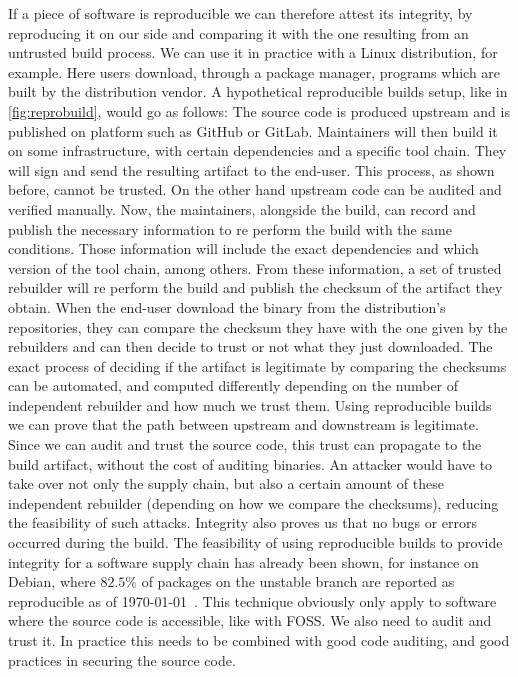 \documentclass[a4paper,11pt,oneside]{report}
\theoremstyle{definition}
\newcommand{\rb}{reproducible builds\xspace}
\begin{document}
If a piece of software is reproducible we can therefore attest its integrity,
by reproducing it on our side and comparing it with the one resulting from an
untrusted build process. We can use it in practice with a Linux distribution,
for example. Here users download, through a package manager, programs which are
built by the distribution vendor. A hypothetical \rb setup, like in
\autoref{fig:reprobuild}, would go as follows: The source code is produced
upstream and is published on platform such as GitHub or GitLab. Maintainers
will then build it on some infrastructure, with certain dependencies and a
specific tool chain. They will sign and send the resulting artifact to the
end-user. This process, as shown before, cannot be trusted. On the other hand
upstream code can be audited and verified manually. Now, the maintainers,
alongside the build, can record and publish the necessary information to re
perform the build with the same conditions. Those information will include the
exact dependencies and which version of the tool chain, among others. From these information, a set of trusted
rebuilder will re perform the build and publish the checksum of the artifact
they obtain. When the end-user download the binary from the distribution's
repositories, they can compare the checksum they have with the one given by the
rebuilders and can then decide to trust or not what they just downloaded. The
exact process of deciding if the artifact is legitimate by comparing the
checksums can be automated, and computed differently depending on the number of
independent rebuilder and how much we trust them.
Using \rb we can prove that the path between upstream and downstream is
legitimate. Since we can audit and trust the source code, this trust can
propagate to the build artifact, without the cost of auditing binaries. An
attacker would have to take over not only the supply chain, but also a certain
amount of these independent rebuilder (depending on how we compare the
checksums), reducing the feasibility of such attacks. Integrity also proves us
that no bugs or errors occurred during the build. The feasibility of using \rb
to provide integrity for a software supply chain has already been shown, for
instance on Debian, where $82.5\%$ of packages on the unstable branch are
reported as reproducible as of \today~\cite{debian:repro}.
This technique obviously only apply to software where the source code is
accessible, like with FOSS. We also need to audit and trust it. In practice
this needs to be combined with good code auditing, and good practices in
securing the source code.
\end{document}
